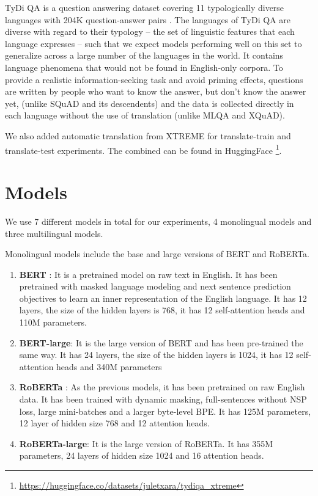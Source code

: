 \documentclass[11pt]{article}
\begin{document}
TyDi QA is a question answering dataset covering 11 typologically diverse languages with 204K question-answer pairs \cite{tydiqa}. The languages of TyDi QA are diverse with regard to their typology -- the set of linguistic features that each language expresses -- such that we expect models performing well on this set to generalize across a large number of the languages in the world. It contains language phenomena that would not be found in English-only corpora. To provide a realistic information-seeking task and avoid priming effects, questions are written by people who want to know the answer, but don’t know the answer yet, (unlike SQuAD and its descendents) and the data is collected directly in each language without the use of translation (unlike MLQA and XQuAD).

We also added automatic translation from XTREME \cite{XTREME} for translate-train and translate-test experiments. The combined can be found in HuggingFace \footnote{\url{https://huggingface.co/datasets/juletxara/tydiqa_xtreme}}.

\section{Models}

We use 7 different models in total for our experiments, 4 monolingual models and three multilingual models.

Monolingual models include the base and large versions of BERT and RoBERTa.

\begin{enumerate}
    \item \textbf{BERT} \cite{BERT}: It is a pretrained model on raw text in English. It has been pretrained with masked language modeling and next sentence prediction objectives to learn an inner representation of the English language. It has 12 layers, the size of the hidden layers is 768, it has 12 self-attention heads and 110M parameters.
    \item \textbf{BERT-large}: It is the large version of BERT and has been pre-trained the same way. It has 24 layers, the size of the hidden layers is 1024, it has 12 self-attention heads and 340M parameters
    \item \textbf{RoBERTa} \cite{ROBERTA}: As the previous models, it has been pretrained on raw English data. It has been trained with dynamic masking, full-sentences without NSP loss, large mini-batches and a larger byte-level BPE. It has 125M parameters, 12 layer of hidden size 768 and 12 attention heads.
    \item \textbf{RoBERTa-large}: It is the large version of RoBERTa. It has 355M parameters, 24 layers of hidden size 1024 and 16 attention heads.
\end{enumerate}
\end{document}
